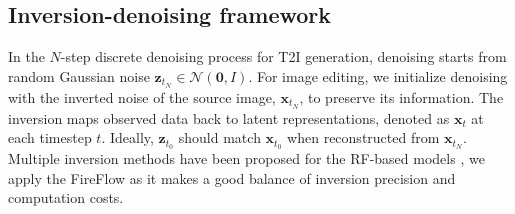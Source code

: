 \documentclass{article}
\begin{document}


\subsection{Inversion-denoising framework}



In  the  $N$-step discrete denoising process for T2I generation, denoising starts from random Gaussian noise $\mathbf{z}_{t_{N}}\in\mathcal{N}(\mathbf{0}, I)$. For image editing, we initialize denoising with the inverted noise of the source image, $\mathbf{x}_{t_N}$, to preserve its information. The inversion maps observed data back to latent representations, denoted as $\mathbf{x}_{t}$ at each timestep $t$. Ideally, $\mathbf{z}_{t_0}$ should match $\mathbf{x}_{t_0}$ when reconstructed from $\mathbf{x}_{t_N}$. Multiple inversion methods have been proposed for the RF-based models \citep{rout2024semantic, wang2024taming, deng2024fireflow}, we apply the FireFlow \citep{deng2024fireflow}  as it makes a good balance of inversion precision and computation costs.

\end{document}
